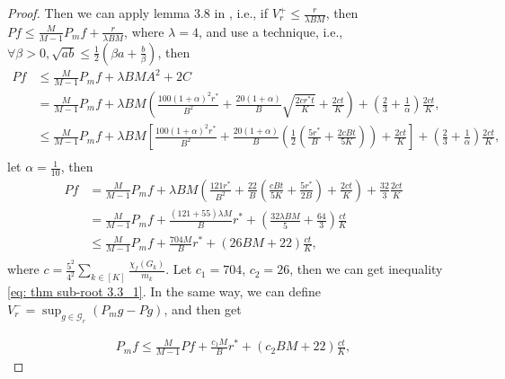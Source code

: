 \documentclass{article}
\begin{document}
\begin{proof}
Then we can apply lemma 3.8 in \cite{Bartlett_2005}, i.e., if $V_r^+ \leq \frac{r}{\lambda B M }$, then $P f \leq \frac{M}{M-1} P_m f + \frac{r}{\lambda BM}$, where $\lambda = 4$, and use a technique, i.e., $\forall \beta >0 , \sqrt{ab} \leq \frac{1}{2}(\beta a + \frac{b}{\beta})$, then
\begin{align*}
    P f & \leq \frac{M}{M-1} P _m f + \lambda BMA^2 +2C \\
    & = \frac{M}{M-1} P _m f + \lambda B M (\frac{100(1+\alpha)^2 r^*}{B^2} + \frac{20(1+\alpha)}{B} \sqrt{\frac{2cr^*t}{K}} + \frac{2ct}{K}) + (\frac{2}{3}+\frac{1}{\alpha}) \frac{2ct}{K}, \\
     & \leq \frac{M}{M-1} P _m f + \lambda B M \left[\frac{100(1+\alpha)^2 r^*}{B^2} + \frac{20(1+\alpha)}{B} \left(\frac{1}{2} ( \frac{5r^*}{B} +  \frac{2cBt}{5K}) \right) + \frac{2ct}{K}  \right] + (\frac{2}{3}+\frac{1}{\alpha}) \frac{2ct}{K}, \\
\end{align*}
let $\alpha = \frac{1}{10}$, then
\begin{align*}
    P f & = \frac{M}{M-1} P _m f + \lambda B M (\frac{121 r^*}{B^2} + \frac{22}{B} (\frac{cBt}{5K} + \frac{5r^*}{2B}) + \frac{2ct}{K}) + \frac{32}{3} \frac{2ct}{K} \\
    & = \frac{M}{M-1} P _m f + \frac{(121+55)\lambda M}{B} r^* + \left( \frac{32 \lambda B M}{5} + \frac{64}{3} \right) \frac{ct}{K} \\
    & \leq \frac{M}{M-1} P _m f + \frac{704 M}{B} r^* + (26 BM +22 ) \frac{ct}{K}, \\
\end{align*}
where $c = \frac{5^2}{4^2} \sum _{k \in [K]} \frac{\chi_f(G_k)}{m_k}$. Let $c_1 = 704$, $c_2 = 26$, then we can get inequality \eqref{eq: thm sub-root 3.3_1}. In the same way, we can define $V_r^- = \sup _{g \in \mathcal{G}_r} (P _m g - P g)$, and then get 

\begin{align} \label{eq: thm sub-root 3.3_2}
     P_m f \leq \frac{M}{M-1} P  f + \frac{c_1 M}{B} r^* + (c_2 BM +22 ) \frac{ct}{K},
\end{align}
\end{proof}
\end{document}
